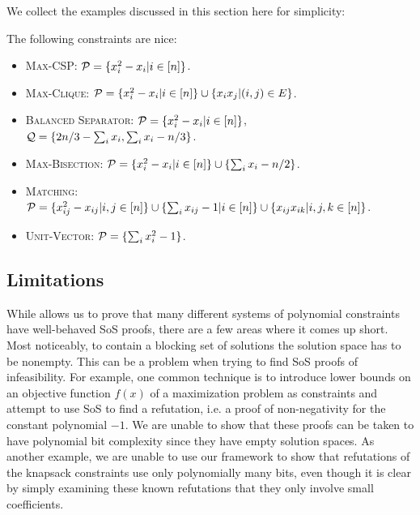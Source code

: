We collect the examples discussed in this section here for simplicity:
\begin{corollary}\label{cor:examples}
The following constraints are nice:
\begin{itemize}
\item \textsc{Max-CSP}: $\mathcal P = \{x_i^2 - x_i | i \in [n]\}$. 
\item \textsc{Max-Clique}: $\mathcal P = \{x_i^2 - x_i | i \in [n]\} \cup \{x_ix_j | (i,j) \in E\}$.
\item \textsc{Balanced Separator}: $\mathcal P = \{x_i^2 - x_i | i \in [n]\}$, $\mathcal Q = \{2n/3 - \sum_i x_i, \sum_i x_i - n/3\}$.
\item \textsc{Max-Bisection}: $\mathcal P = \{x_i^2 - x_i | i \in [n]\} \cup \{\sum_i x_i - n/2\}$.
\item \textsc{Matching}: $\mathcal P = \{x_{ij}^2 - x_{ij} | i,j \in [n]\} \cup \{\sum_i x_{ij} - 1 | i \in [n]\} \cup \{x_{ij}x_{ik} | i,j,k \in [n]\}$.
\item \textsc{Unit-Vector}: $\mathcal P = \{\sum_i x_i^2 - 1\}$.
\end{itemize}
\end{corollary}

\subsection{Limitations}
While  allows us to prove that many different systems of polynomial constraints have well-behaved SoS proofs, there are a few areas where it comes up short. Most noticeably, to contain a blocking set of solutions the solution space has to be nonempty. This can be a problem when trying to find SoS proofs of infeasibility. For example, one common technique is to introduce lower bounds on an objective function $f(x)$ of a maximization problem as constraints and attempt to use SoS to find a refutation, i.e. a proof of non-negativity for the constant polynomial $-1$. We are unable to show that these proofs can be taken to have polynomial bit complexity since they have empty solution spaces. As another example, we are unable to use our framework to show that refutations of the knapsack constraints use only polynomially many bits, even though it is clear by simply examining these known refutations that they only involve small coefficients. 